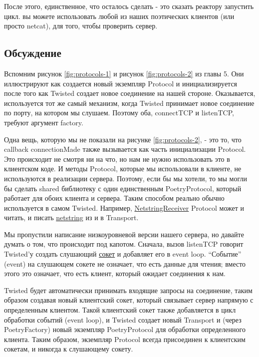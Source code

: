 После этого, единственное, что осталось сделать - это сказать 
реактору запустить цикл. вы можете использовать любой из 
наших поэтических клиентов (или просто netcat), для того, 
чтобы проверить сервер.


\subsection{Обсуждение}


Вспомним рисунок \ref{fig:protocols-1} и рисунок \ref{fig:protocols-2} из главы 5. 
Они иллюстрируют как создается новый экземпляр Protocol и 
инициализируется после того как Twisted создает новое 
соединение на нашей стороне. Оказывается, используется тот же самый механизм, 
когда Twisted принимает новое соединение по порту, на котором 
мы слушаем. Поэтому оба, connectTCP и listenTCP, требуют аргумент factory.


Одна вещь, которую мы не показали на рисунке \ref{fig:protocols-2}, - это 
то, что callback connectionMade также вызывается как часть инициализации \newline 
Protocol. Это происходит не смотря ни на что, но нам не нужно 
использовать это в клиентском коде. И методы Protocol, которые мы 
использовали в клиенте, не используются в реализации сервера. Поэтому, 
если бы мы хотели, то мы могли бы сделать shared библиотеку с 
один единственным PoetryProtocol, который работает для обоих клиента и 
сервера. Таким способом реально обычно используется в 
самом Twisted. Например, 
\href{http://twistedmatrix.com/trac/browser/tags/releases/twisted-8.2.0/twisted/protocols/basic.py#L31}{NetstringReceiver} Protocol может и читать, и писать 
\href{http://en.wikipedia.org/wiki/Netstrings}{netstring} из и в Transport.


Мы пропустили написание низкоуровневой версии нашего сервера, 
но давайте думать о том, что происходит под капотом. Сначала, 
вызов listenTCP говорит Twisted'у создать слушающий 
\href{http://en.wikipedia.org/wiki/Berkeley\_sockets#listen.28.29}{сокет} и 
добавляет его в event loop. ``Событие'' (event) на 
слушающем сокете не означает, что есть данные для чтения; 
вместо этого это означает, что есть клиент, который ожидает соединения к нам.


Twisted будет автоматически принимать входящие запросы на 
соединение, таким образом создавая новый клиентский сокет, 
который связывает сервер напрямую с определенным клиентом. 
Такой клиентский сокет также добавляется в цикл обработки 
событий (event loop), и Twisted создает новый Transport и 
(через PoetryFactory) новый экземпляр \newline PoetryProtocol для 
обработки определенного клиента. Таким образом, экземпляр 
Protocol всегда присоединен к клиентским сокетам, и никогда 
к слушающему сокету.


